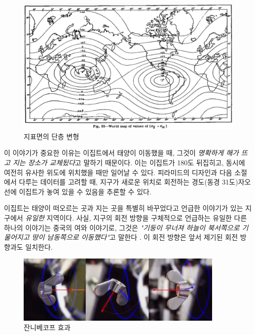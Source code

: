 \documentclass[10pt,twocolumn,letterpaper]{article}
\begin{document}
\begin{figure}[t]
\begin{center}
   \includegraphics[width=1\linewidth]{meinesz3.jpg}
\end{center}
   \caption{지표면의 단층 변형  \cite{36}}
\label{fig:8}
\label{fig:onecol}
\end{figure}


이 이야기가 중요한 이유는 이집트에서 태양이 이동했을 때, 그것이 \textit{ 명확하게 해가 뜨고 지는 장소가 교체됬다}고 말하기 때문이다. 이는 이집트가 180도 뒤집히고, 동시에 여전히 유사한 위도에 위치했을 때만 일어날 수 있다. 피라미드의 디자인과 다음 소절에서 다루는 데이터를 고려할 때, 지구가 새로운 위치로 회전하는 경도(동경 31도)자오선에 이집트가  놓여 있을 수 있음을 추론할 수 있다.

이집트는 태양이 떠오르는 곳과 지는 곳을 특별히 바꾸었다고 언급한 이야기가 있는 지구에서 \textit{유일한} 지역이다. 사실, 지구의 회전 방향을 구체적으로 언급하는 유일한 다른 하나의 이야기는 중국의 여와 이야기로, 그것은 \textit{"기둥이 무너져 하늘이 북서쪽으로 기울어지고 땅이 남동쪽으로 이동했다"}고 말한다 \cite{8}. 이 회전 방향은 앞서 제기된 회전 방향과도 일치한다.


\begin{figure}[t]
\begin{center}
\includegraphics[width=0.9\textwidth]{dzhani.jpg}
\end{center}
   \caption{잔니베코프 효과  \cite{28}}
\label{fig:10}
\end{figure}
\end{document}
